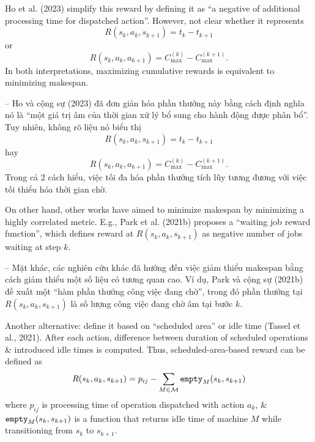 \documentclass{article}
\begin{document}
\begin{itemize}
\begin{itemize}
        Ho et al. (2023) simplify this reward by defining it as ``a negative of additional processing time for dispatched action''. However, not clear whether it represents
        \begin{equation*}
            R(s_k,a_k,s_{k+1}) = t_k - t_{k+1}
        \end{equation*}
        or
        \begin{equation*}
            R(s_k,a_k,a_{k+1}) = C_{\max}^{(k)} - C_{\max}^{(k+1)}.
        \end{equation*}
        In both interpretations, maximizing cumulative rewards is equivalent to minimizing makespan.

        -- Ho và cộng sự (2023) đã đơn giản hóa phần thưởng này bằng cách định nghĩa nó là ``một giá trị âm của thời gian xử lý bổ sung cho hành động được phân bổ''. Tuy nhiên, không rõ liệu nó biểu thị
        \begin{equation*}
            R(s_k,a_k,s_{k+1}) = t_k - t_{k+1}
        \end{equation*}
        hay
        \begin{equation*}
            R(s_k,a_k,a_{k+1}) = C_{\max}^{(k)} - C_{\max}^{(k+1)}.
        \end{equation*}
        Trong cả 2 cách hiểu, việc tối đa hóa phần thưởng tích lũy tương đương với việc tối thiểu hóa thời gian chờ.

        On other hand, other works have aimed to minimize makespan by minimizing a highly correlated metric. E.g., Park et al. (2021b) proposes a ``waiting job reward function'', which defines reward at $R(s_k,a_k,s_{k+1})$ as negative number of jobs waiting at step $k$.

        -- Mặt khác, các nghiên cứu khác đã hướng đến việc giảm thiểu makespan bằng cách giảm thiểu một số liệu có tương quan cao. Ví dụ, Park và cộng sự (2021b) đề xuất một ``hàm phần thưởng công việc đang chờ'', trong đó phần thưởng tại $R(s_k,a_k,s_{k+1})$ là số lượng công việc đang chờ âm tại bước $k$.

        Another alternative: define it based on ``scheduled area'' or idle time (Tassel et al., 2021). After each action, difference between duration of scheduled operations \& introduced idle times is computed. Thus, scheduled-area-based reward can be defined as
        \begin{equation*}
            R(s_k,a_k,s_{k+1}) = p_{ij} - \sum_{M\in{\cal M}} {\tt empty}_M(s_k,s_{k+1})
        \end{equation*}
        where $p_{ij}$ is processing time of operation dispatched with action $a_k$, \& ${\tt empty}_M(s_k,s_{k+1})$ is a function that returns idle time of machine $M$ while transitioning from $s_k$ to $s_{k+1}$.


\end{itemize}
\end{itemize}
\end{document}
